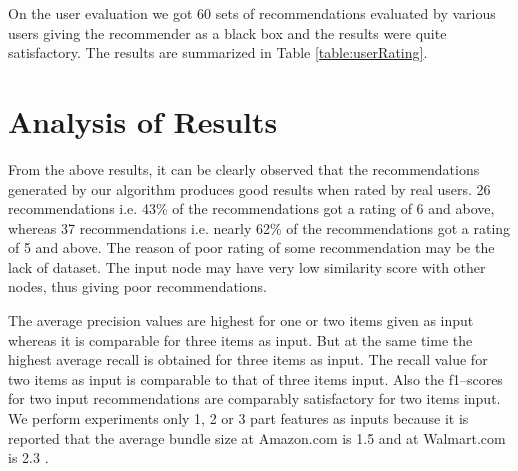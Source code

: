 On the user evaluation we got 60 sets of recommendations evaluated by various users giving the recommender as a black box and the results were quite satisfactory. The results are summarized in Table \ref{table:userRating}.

\section{Analysis of Results}

From the above results, it can be clearly observed that the recommendations generated by our algorithm produces good results when rated by real users. 26 recommendations i.e. 43\% of the recommendations got a rating of 6 and above, whereas 37 recommendations i.e. nearly 62\% of the recommendations got a rating of 5 and above. The reason of poor rating of some recommendation may be the lack of dataset. The input node may have very low similarity score with other nodes, thus giving poor recommendations.

The average precision values are highest for one or two items given as input whereas it is comparable for three items as input. But at the same time the highest average recall is obtained for three items as input. The recall value for two items as input is comparable to that of three items input. Also the f1--scores for two input recommendations are comparably satisfactory for two items input. We perform experiments only 1, 2 or 3 part features as inputs because it is reported that the average bundle size at Amazon.com is 1.5 and at Walmart.com is 2.3 \cite{bundleReco}.






